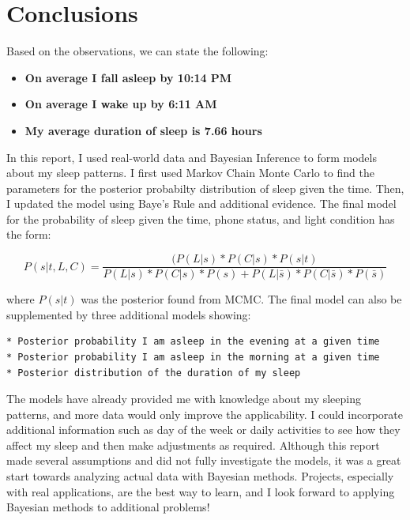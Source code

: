 \documentclass[12pt]{article}
\providecommand{\tightlist}{%
      \setlength{\itemsep}{0pt}\setlength{\parskip}{0pt}}
\begin{document}
    \hypertarget{conclusions}{%
\section{Conclusions}\label{conclusions}}

Based on the observations, we can state the following:

\begin{itemize}
\tightlist
\item
  \textbf{On average I fall asleep by 10:14 PM}
\item
  \textbf{On average I wake up by 6:11 AM}
\item
  \textbf{My average duration of sleep is 7.66 hours}
\end{itemize}

In this report, I used real-world data and Bayesian Inference to form
models about my sleep patterns. I first used Markov Chain Monte Carlo to
find the parameters for the posterior probabilty distribution of sleep
given the time. Then, I updated the model using Baye's Rule and
additional evidence. The final model for the probability of sleep given
the time, phone status, and light condition has the form:

\[P(s | t, L, C) = \frac{(P(L|s) * P(C|s) * P(s|t)}{P(L|s) * P(C|s) * P(s) + P(L|\bar{s}) * P(C|\bar{s}) * P(\bar{s})}\]

where \(P(s|t)\) was the posterior found from MCMC. The final model can
also be supplemented by three additional models showing:

\begin{verbatim}
* Posterior probability I am asleep in the evening at a given time
* Posterior probability I am asleep in the morning at a given time
* Posterior distribution of the duration of my sleep 
\end{verbatim}

The models have already provided me with knowledge about my sleeping
patterns, and more data would only improve the applicability. I could
incorporate additional information such as day of the week or daily
activities to see how they affect my sleep and then make adjustments as
required. Although this report made several assumptions and did not
fully investigate the models, it was a great start towards analyzing
actual data with Bayesian methods. Projects, especially with real
applications, are the best way to learn, and I look forward to applying
Bayesian methods to additional problems!


    
    
    
    
\end{document}
